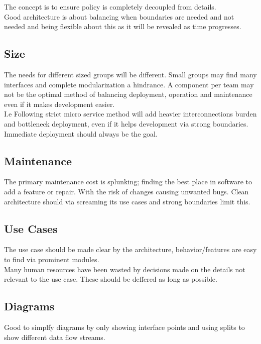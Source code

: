 \documentclass[11pt]{scrartcl} %
\begin{document}
The concept is to ensure policy is completely decoupled from details.\\

Good architecture is about balancing when boundaries are needed and not needed and being flexible 
about this as it will be revealed as time progresses.

\subsection{Size}

The needs for different sized groups will be different. Small groups may find many interfaces and 
complete modularization a hindrance. A component per team may not be the optimal method of balancing
deployment, operation and maintenance even if it makes development easier.\\

I.e Following strict micro service method will add heavier interconnections burden and bottleneck 
deployment, even if it helps development via strong boundaries. Immediate deployment should
always be the goal.

\subsection{Maintenance}

The primary maintenance cost is splunking; finding the best place in software to add a feature or repair.
With the risk of changes causing unwanted bugs. Clean architecture should via screaming its use cases and strong
boundaries limit this.

\subsection{Use Cases}

The use case should be made clear by the architecture, behavior/features are easy to find via
prominent modules.\\

Many human resources have been wasted by decisions made on the details not relevant to the use case.
These should be deffered as long as possible. 

\subsection{Diagrams}

Good to simplfy diagrams by only showing interface points and using splits to show 
different data flow streams.
\end{document}
